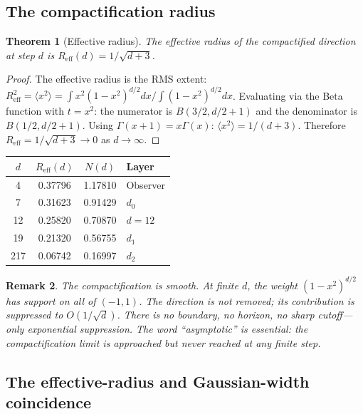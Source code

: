 \documentclass[11pt,a4paper]{article}
\newtheorem{theorem}{Theorem}[section]
\newtheorem{remark}[theorem]{Remark}
\begin{document}
\subsection{The compactification radius}

\begin{theorem}[Effective radius]
The effective radius of the compactified direction at step $d$ is $R_{\mathrm{eff}}(d) = 1/\sqrt{d+3}$.
\end{theorem}

\begin{proof}
The effective radius is the RMS extent: $R_{\mathrm{eff}}^2 = \langle x^2\rangle = \int x^2(1-x^2)^{d/2}dx\Big/\int(1-x^2)^{d/2}dx$. Evaluating via the Beta function with $t = x^2$: the numerator is $B(3/2, d/2+1)$ and the denominator is $B(1/2, d/2+1)$. Using $\Gamma(x+1) = x\Gamma(x)$: $\langle x^2\rangle = 1/(d+3)$. Therefore $R_{\mathrm{eff}} = 1/\sqrt{d+3}\to 0$ as $d\to\infty$.
\end{proof}

\begin{center}
\begin{tabular}{cccl}
\toprule
$d$ & $R_{\mathrm{eff}}(d)$ & $N(d)$ & Layer\\
\midrule
4 & 0.37796 & 1.17810 & Observer\\
7 & 0.31623 & 0.91429 & $d_0$\\
12 & 0.25820 & 0.70870 & $d=12$\\
19 & 0.21320 & 0.56755 & $d_1$\\
217 & 0.06742 & 0.16997 & $d_2$\\
\bottomrule
\end{tabular}
\end{center}

\begin{remark}
The compactification is smooth. At finite $d$, the weight $(1-x^2)^{d/2}$ has
support on all of $(-1,1)$. The direction is not removed; its contribution is suppressed to
$O(1/\sqrt{d})$. There is no boundary, no horizon, no sharp cutoff---only exponential suppression.
The word ``asymptotic'' is essential: the compactification limit is approached but never
reached at any finite step.
\end{remark}

\subsection{The effective-radius and Gaussian-width coincidence}
\end{document}
